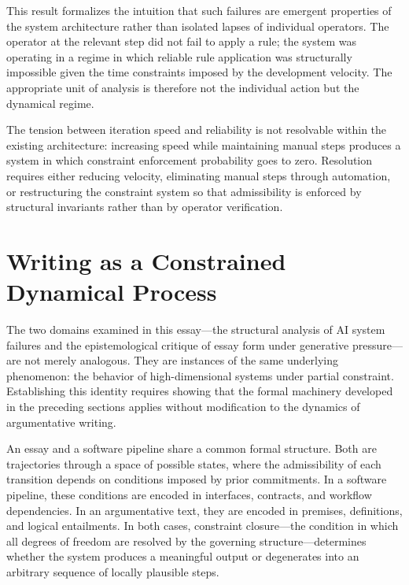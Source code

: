 \documentclass[12pt, oneside]{article}
\theoremstyle{plain}
\theoremstyle{definition}
\theoremstyle{remark}
\begin{document}
This result formalizes the intuition that such failures are emergent properties of the
system architecture rather than isolated lapses of individual operators. The operator at
the relevant step did not fail to apply a rule; the system was operating in a regime in
which reliable rule application was structurally impossible given the time constraints
imposed by the development velocity. The appropriate unit of analysis is therefore not the
individual action but the dynamical regime.

The tension between iteration speed and reliability is not resolvable within the existing
architecture: increasing speed while maintaining manual steps produces a system in which
constraint enforcement probability goes to zero. Resolution requires either reducing velocity,
eliminating manual steps through automation, or restructuring the constraint system so that
admissibility is enforced by structural invariants rather than by operator verification.

\section{Writing as a Constrained Dynamical Process}

The two domains examined in this essay---the structural analysis of AI system failures and
the epistemological critique of essay form under generative pressure---are not merely
analogous. They are instances of the same underlying phenomenon: the behavior of
high-dimensional systems under partial constraint. Establishing this identity requires
showing that the formal machinery developed in the preceding sections applies without
modification to the dynamics of argumentative writing.

An essay and a software pipeline share a common formal structure. Both are trajectories
through a space of possible states, where the admissibility of each transition depends on
conditions imposed by prior commitments. In a software pipeline, these conditions are
encoded in interfaces, contracts, and workflow dependencies. In an argumentative text, they
are encoded in premises, definitions, and logical entailments. In both cases, constraint
closure---the condition in which all degrees of freedom are resolved by the governing
structure---determines whether the system produces a meaningful output or degenerates into
an arbitrary sequence of locally plausible steps.
\end{document}
